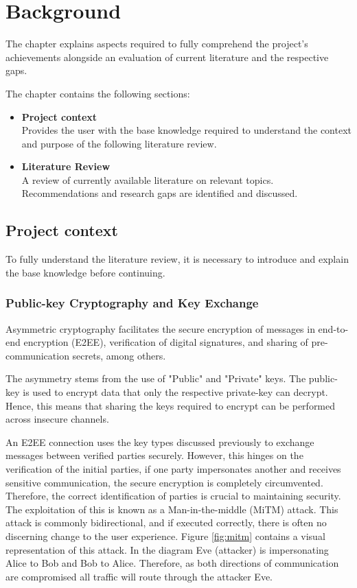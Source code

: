 \chapter{Background}
\label{cha:LiteratureReview}

The chapter explains aspects required to fully comprehend the project's achievements alongside an evaluation of current literature and the respective gaps.

The chapter contains the following sections:

\begin{itemize}
    \item \textbf{Project context} \\ 
    Provides the user with the base knowledge required to understand the context and purpose of the following literature review.
    
    \item \textbf{Literature Review} \\
    A review of currently available literature on relevant topics. Recommendations and research gaps are identified and discussed.

\end{itemize}

\section{Project context}

To fully understand the literature review, it is necessary to introduce and explain the base knowledge before continuing.

\subsection{Public-key Cryptography and Key Exchange}

Asymmetric cryptography facilitates the secure encryption of messages in end-to-end encryption (E2EE), verification of digital signatures, and sharing of pre-communication secrets, among others. 

The asymmetry stems from the use of "Public" and "Private" keys. The public-key is used to encrypt data that only the respective private-key can decrypt. Hence, this means that sharing the keys required to encrypt can be performed across insecure channels.

An E2EE connection uses the key types discussed previously to exchange messages between verified parties securely. However, this hinges on the verification of the initial parties, if one party impersonates another and receives sensitive communication, the secure encryption is completely circumvented. Therefore, the correct identification of parties is crucial to maintaining security. The exploitation of this is known as a Man-in-the-middle (MiTM) attack. This attack is commonly bidirectional, and if executed correctly, there is often no discerning change to the user experience. Figure \ref{fig:mitm} contains a visual representation of this attack. In the diagram Eve (attacker) is impersonating Alice to Bob and Bob to Alice. Therefore, as both directions of communication are compromised all traffic will route through the attacker Eve.


